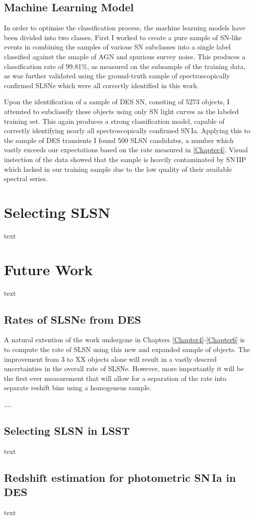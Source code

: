 \subsection{Machine Learning Model}
In order to optimise the classification process, the machine learning models have been divided into two classes. First I worked to create a pure sample of SN-like events in combining the samples of various SN subclasses into a single label classified against the smaple of AGN and spurious survey noise. This produces a classification rate of 99.81\%, as measured on the subsample of the training data, as was further validated using the ground-truth sample of spectroscopically confirmed SLSNe which were all correctly identified in this work.

Upon the identification of a sample of DES SN, consiting of 5273 objects, I attemted to subclassify these objects using only SN light curves as the labeled training set. This again produces a strong classification model, capable of correctly identifying nearly all spectroscopically confirmed SN\,Ia. Applying this to the sample of DES transients I found 500 SLSN candidates, a number which vastly exceeds our expectations based on the rate measured in \cref{Chapter4}. Visual instection of the data showed that the sample is heavily contaminated by SN\,IIP which lacked in our training sample due to the low quality of their available spectral series.

\section{Selecting SLSN}
text

\section{Future Work}
text

\subsection{Rates of SLSNe from DES}
A natural extention of the work undergone in Chapters \ref{Chapter4}-\ref{Chapter6} is to compute the rate of SLSN using this new and expanded sample of objects. The improvement from 3 to XX objects alone will result in a vastly descred uncertainties in the overall rate of SLSNe. However, more importantly it will be the first ever measurement that will allow for a separation of the rate into separate reshift bins using a homogeneus sample.

....

\subsection{Selecting SLSN in LSST}
text

\subsection{Redshift estimation for photometric SN\,Ia in DES}
text
